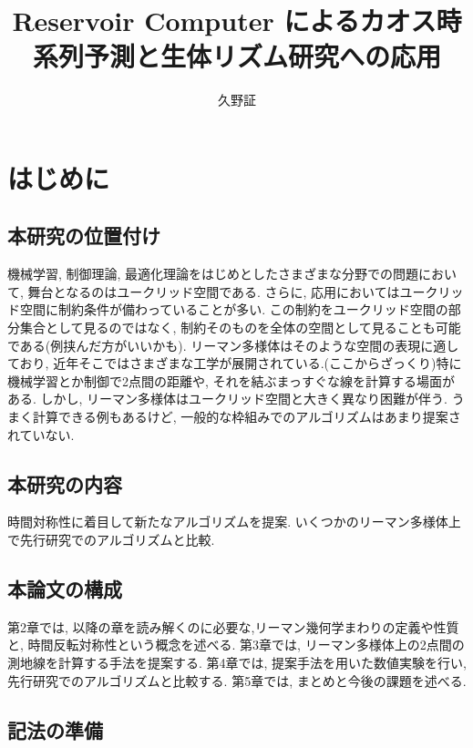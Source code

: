 \documentclass[uplatex]{suribt}
\title{Reservoir Computer によるカオス時系列予測と生体リズム研究への応用}
\author{久野証}
\theoremstyle{definition}
\begin{document}
\maketitle%

\frontmatter%
\begin{abstract}%
\end{abstract}

\tableofcontents%

\mainmatter%
\chapter{はじめに}

\section{本研究の位置付け}
機械学習, 制御理論, 最適化理論をはじめとしたさまざまな分野での問題において, 舞台となるのはユークリッド空間である. さらに, 応用においてはユークリッド空間に制約条件が備わっていることが多い. この制約をユークリッド空間の部分集合として見るのではなく, 制約そのものを全体の空間として見ることも可能である(例挟んだ方がいいかも). リーマン多様体はそのような空間の表現に適しており, 近年そこではさまざまな工学が展開されている.(ここからざっくり)特に機械学習とか制御で2点間の距離や, それを結ぶまっすぐな線を計算する場面がある. しかし, リーマン多様体はユークリッド空間と大きく異なり困難が伴う. うまく計算できる例もあるけど, 一般的な枠組みでのアルゴリズムはあまり提案されていない.
\section{本研究の内容}
時間対称性に着目して新たなアルゴリズムを提案. いくつかのリーマン多様体上で先行研究でのアルゴリズムと比較.
\section{本論文の構成}
第2章では, 以降の章を読み解くのに必要な,リーマン幾何学まわりの定義や性質と, 時間反転対称性という概念を述べる. 第3章では, リーマン多様体上の2点間の測地線を計算する手法を提案する. 第4章では, 提案手法を用いた数値実験を行い, 先行研究でのアルゴリズムと比較する. 第5章では, まとめと今後の課題を述べる.
\section{記法の準備}
\end{document}
